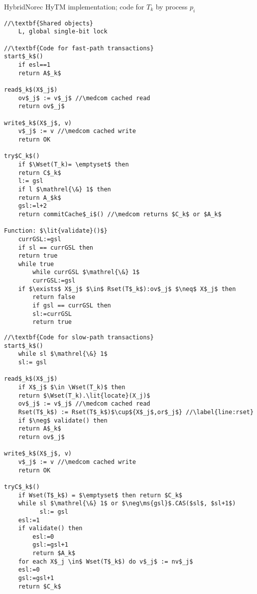 \begin{algorithm*}[!h]
\caption{HybridNorec HyTM implementation; code for $T_k$ by process $p_i$}
\label{alg:inswrite3}
\vspace{-1mm}
\noindent\lstset{style=customc}
\begin{minipage}{0.49\textwidth}
\begin{lstlisting}[frame=none,firstnumber=1,mathescape=true]
//\textbf{Shared objects}
    L, global single-bit lock

//\textbf{Code for fast-path transactions}
start$_k$()
    if esl==1
	return A$_k$

read$_k$(X$_j$)
    ov$_j$ := v$_j$ //\medcom cached read
    return ov$_j$

write$_k$(X$_j$, v)
    v$_j$ := v //\medcom cached write
    return OK

try$C_k$()
    if $\Wset(T_k)= \emptyset$ then
	return C$_k$
    l:= gsl
    if l $\mathrel{\&} 1$ then
	return A_$k$
    gsl:=l+2
    return commitCache$_i$() //\medcom returns $C_k$ or $A_k$

Function: $\lit{validate}()$}
    currGSL:=gsl
    if sl == currGSL then
	return true
    while true
        while currGSL $\mathrel{\&} 1$
	    currGSL:=gsl
	if $\exists$ X$_j$ $\in$ Rset(T$_k$):ov$_j$ $\neq$ X$_j$ then
	    return false
    	if gsl == currGSL then
	    sl:=currGSL
	    return true

\end{lstlisting}
\end{minipage}
\begin{minipage}{0.49\textwidth}
\begin{lstlisting}[frame=none,firstnumber=last,mathescape=true]
//\textbf{Code for slow-path transactions}
start$_k$()
    while sl $\mathrel{\&} 1$
	sl:= gsl

read$_k$(X$_j$)
    if X$_j$ $\in \Wset(T_k)$ then
	return $\Wset(T_k).\lit{locate}(X_j)$ 
    ov$_j$ := v$_j$ //\medcom cached read
    Rset(T$_k$) := Rset(T$_k$)$\cup${X$_j$,or$_j$} //\label{line:rset}
    if $\neg$ validate() then 
	return A$_k$
    return ov$_j$

write$_k$(X$_j$, v)
    v$_j$ := v //\medcom cached write
    return OK

tryC$_k$()
    if Wset(T$_k$) = $\emptyset$ then return $C_k$
    while sl $\mathrel{\&} 1$ or $\neg\ms{gsl}$.CAS($sl$, $sl+1$)  
          sl:= gsl
    esl:=1
    if validate() then
        esl:=0
        gsl:=gsl+1
        return $A_k$
    for each X$_j \in$ Wset(T$_k$) do v$_j$ := nv$_j$
    esl:=0
    gsl:=gsl+1
    return $C_k$
\end{lstlisting}
\end{minipage}
\vspace{-1mm}
\end{algorithm*}

